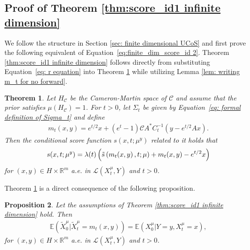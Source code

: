 \documentclass[10pt]{article} %
\def\Eqref#1{Equation~\ref{#1}}
\newcommand{\E}{\mathbb{E}}
\newcommand{\R}{\mathbb{R}}
\theoremstyle{plain}
\newtheorem{theorem}{Theorem}[section]
\newtheorem{proposition}[theorem]{Proposition}
\theoremstyle{definition}
\theoremstyle{remark}
\renewcommand{\L}{\mathscr{L}}
\newcommand{\C}{\mathcal C}
\begin{document}


\subsection{Proof of Theorem \ref{thm:score_id1 infinite dimension}} 
We follow the structure in Section \ref{sec: finite dimensional UCoS} and first prove the following equivalent of \Eqref{eq:finite_dim_score_id 2}. Theorem \ref{thm:score_id1 infinite dimension} follows directly from substituting  \Eqref{eq: r equation} into Theorem \ref{thm:prestep to score_id1 infinite dimension} while utilizing Lemma \ref{lem: writing m_t for no forward}.
\begin{theorem}\label{thm:prestep to score_id1 infinite dimension}
Let $H_{\C}$ be the Cameron-Martin space of $\C$ and assume that the prior satisfies $\mu(H_{\C}) = 1$. For $t>0$, let $\Sigma_t$ be given by  \Eqref{eq: formal definition of Sigma_t} and define   
\begin{eqnarray}\label{eq: definition of mut}
    m_t(x, y) = e^{t/2}x + (e^t - 1)\C A^* C_t^{-1}(y - e^{t/2}Ax).
\end{eqnarray}
Then the conditional score function $s(x,t;\mu^y)$ related to it holds that
\begin{equation}
    \label{eq:conditional_score_id}
    s(x, t; \mu^y) = \lambda(t) \left(  \Tilde{s}\left(m_t(x, y\right), t; \mu) + m_t(x, y) - e^{t/2}x \right)
\end{equation}
for $(x,y) \in H \times \R^m$ a.e. in $\L(X_t^\mu, Y)$ and $t>0$.
\end{theorem}


Theorem \ref{thm:prestep to score_id1 infinite dimension} is a direct consequence of the following proposition.
\begin{proposition}\label{prop:identity_of_expectations}
    Let the assumptions of Theorem \ref{thm:score_id1 infinite dimension} hold. Then
    \begin{eqnarray}\label{eq: equality of expectations in infinite dimensions}
       \E(\widetilde{X}^{\mu}_0 |\widetilde{X}^{\mu}_t = m_t(x,y)) =  \E(X^{\mu}_0 |Y = y, X^{\mu}_t = x),
    \end{eqnarray}
    for $(x,y) \in H \times \R^m$ a.e. in $\L(X_t^\mu, Y)$ and $t>0$.
\end{proposition}

\end{document}

